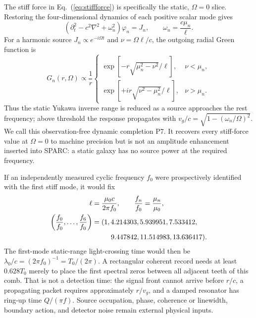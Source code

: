 \documentclass[10pt]{article}
\begin{document}
The stiff force in Eq.~(\ref{eq:stiffforce}) is specifically the static,
$\Omega=0$ slice.  Restoring the four-dimensional dynamics of each positive
scalar mode gives
\begin{equation}
 \left(\partial_t^2-c^2\nabla^2+\omega_n^2\right)\varphi_n=J_n,
 \qquad \omega_n=\frac{c\mu_n}{\ell}.
 \label{eq:breathingmode}
\end{equation}
For a harmonic source $J_n\propto e^{-i\Omega t}$ and
$\nu=\Omega\ell/c$, the outgoing radial Green function is
\begin{equation}
 G_n(r,\Omega)\propto\frac{1}{r}
 \begin{cases}
  \exp[-r\sqrt{\mu_n^2-\nu^2}/\ell],&\nu<\mu_n,\\
  \exp[+ir\sqrt{\nu^2-\mu_n^2}/\ell],&\nu>\mu_n.
 \end{cases}
 \label{eq:breathinggreen}
\end{equation}
Thus the static Yukawa inverse range is reduced as a source approaches the
rest frequency; above threshold the response propagates with
$v_g/c=\sqrt{1-(\omega_n/\Omega)^2}$.  We call this observation-free dynamic
completion P7.  It recovers every stiff-force value at $\Omega=0$ to machine
precision but is not an amplitude enhancement inserted into SPARC: a static
galaxy has no source power at the required frequency.

If an independently measured cyclic frequency $f_0$ were prospectively
identified with the first stiff mode, it would fix
\begin{align}
 \ell&=\frac{\mu_0c}{2\pi f_0},\qquad
 \frac{f_n}{f_0}=\frac{\mu_n}{\mu_0},\nonumber\\
 \left(\frac{f_0}{f_0},\ldots,\frac{f_6}{f_0}\right)
  &= (1,4.214303,5.939951,7.533412,\nonumber\\
  &\hspace{2.7em}9.447842,11.514983,13.636417).
 \label{eq:breathingclock}
\end{align}
The first-mode static-range light-crossing time would then be
$\lambda_0/c=(2\pi f_0)^{-1}=T_0/(2\pi)$.  A rectangular coherent record
needs at least $0.628T_0$ merely to place the first spectral zeros between all
adjacent teeth of this comb.  That is not a detection time: the signal front
cannot arrive before $r/c$, a propagating packet requires approximately
$r/v_g$, and a damped resonator has ring-up time $Q/(\pi f)$.  Source
occupation, phase, coherence or linewidth, boundary action, and detector
noise remain external physical inputs.
\end{document}
